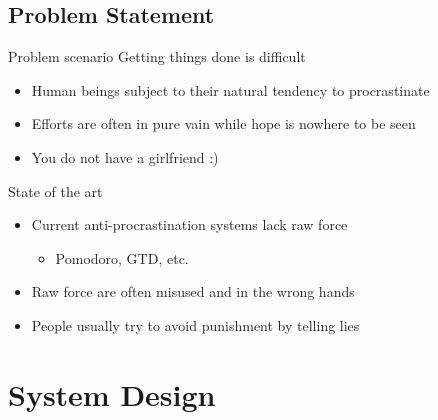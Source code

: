 \documentclass{beamer}
\begin{document}
\subsection{Problem Statement}
\begin{frame}{Problem scenario}
  Getting things done is difficult
  \begin{itemize}
    \item Human beings subject to their natural tendency to procrastinate
    \item Efforts are often in pure vain while hope is nowhere to be seen
    \item You do not have a girlfriend :)
  \end{itemize}
\end{frame}
\begin{frame}{State of the art}
  \begin{itemize}
    \item Current anti-procrastination systems lack raw force
    \begin{itemize}
      \item Pomodoro, GTD, etc.
    \end{itemize}
    \item Raw force are often misused and in the wrong hands
    \item People usually try to avoid punishment by telling lies
  \end{itemize}
\end{frame}
\section{System Design}
\end{document}
